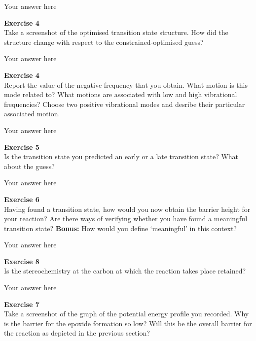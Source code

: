 \documentclass{article}
\begin{document}
Your answer here

\begin{mdframed}
\textbf{Exercise 4}\\
Take a screenshot of the optimised transition state structure. How did the structure change with respect to the constrained-optimised guess?
\end{mdframed}

Your answer here

\begin{mdframed}
\textbf{Exercise 4}\\
Report the value of the negative frequency that you obtain.  What motion is this mode related to?
What motions are associated with low and high vibrational frequencies? Choose two positive vibrational modes and desribe their particular associated motion.
\end{mdframed}

Your answer here

\begin{mdframed}
\textbf{Exercise 5}\\
Is the transition state you predicted an early or a late transition state? What about the guess?
\end{mdframed}

Your answer here

\begin{mdframed}
\textbf{Exercise 6}\\
Having found a transition state, how would you now obtain the barrier height for your reaction? Are there ways of verifying whether you have found a meaningful
transition state? \textbf{Bonus:} How would you define `meaningful' in
this context?
\end{mdframed}

Your answer here

\begin{mdframed}
\textbf{Exercise 8}\\
Is the stereochemistry at the carbon at which the reaction takes
place retained?
\end{mdframed}

Your answer here

\begin{mdframed}
\textbf{Exercise 7}\\
Take a screenshot of the graph of the potential energy profile you
recorded.
Why is the barrier for the epoxide formation so low? Will this be
the overall barrier for the reaction as depicted in the previous section?
\end{mdframed}
\end{document}
